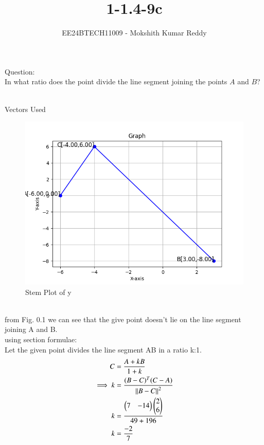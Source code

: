 \documentclass[journal]{IEEEtran}
\begin{document}

\vspace{3cm}

\title{1-1.4-9c}
\author{EE24BTECH11009 - Mokshith Kumar Reddy}
{\let\newpage\relax\maketitle}

\renewcommand{\thefigure}{\theenumi}
\renewcommand{\thetable}{\theenumi}
\setlength{\intextsep}{10pt} %


\renewcommand{\thetable}{\theenumi}
Question:\\
 In what ratio does the point  divide the line segment joining the points $A$ and $B$?\\
\solution\\
\begin{table}[h]
    \centering
    
    \caption{Vectors Used}
    \label{tab.1}
\end{table}
\begin{figure}[h!]
   \centering
   \includegraphics[width=0.7\linewidth]{figs/plot.png}
   \caption{Stem Plot of y}
   \label{stemplot}
\end{figure}
\\from Fig. 0.1 we can see that the give point doesn't lie on the line segment joining A and B.\\
using section formulae:\\
Let the given point divides the line segment AB in a ratio k:1.\\
\begin{align}
C&=\frac{A+kB}{1+k}\\
\implies
k&=\frac{(B-C)^T(C-A)}{\left\vert\left\vert B-C\right\vert\right\vert^2}\\
k&=\frac{
\begin{pmatrix}
7 & -14
\end{pmatrix}
\begin{pmatrix}
2\\
6
\end{pmatrix}
}{49+196}\\
k&=\frac{-2}{7}\\
\end{align}\\
\end{document}
